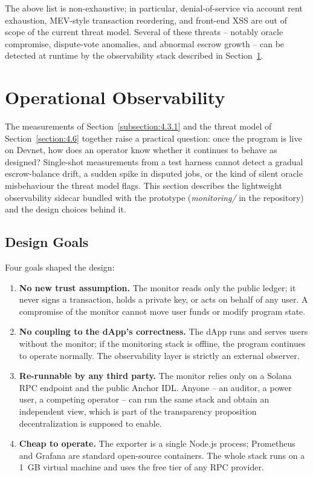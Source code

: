 \noindent The above list is non-exhaustive; in particular, denial-of-service via account rent exhaustion, MEV-style transaction reordering, and front-end XSS are out of scope of the current threat model. Several of these threats -- notably oracle compromise, dispute-vote anomalies, and abnormal escrow growth -- can be detected at runtime by the observability stack described in Section~\ref{section:4.7}.

\section{Operational Observability}
\label{section:4.7}

The measurements of Section~\ref{subsection:4.3.1} and the threat model of Section~\ref{section:4.6} together raise a practical question: once the program is live on Devnet, how does an operator know whether it continues to behave as designed? Single-shot measurements from a test harness cannot detect a gradual escrow-balance drift, a sudden spike in disputed jobs, or the kind of silent oracle misbehaviour the threat model flags. This section describes the lightweight observability sidecar bundled with the prototype (\emph{monitoring/} in the repository) and the design choices behind it.

\subsection{Design Goals}
\label{subsection:4.7.1}

Four goals shaped the design:
\begin{enumerate}[noitemsep]
    \item \textbf{No new trust assumption.} The monitor reads only the public ledger; it never signs a transaction, holds a private key, or acts on behalf of any user. A compromise of the monitor cannot move user funds or modify program state.
    \item \textbf{No coupling to the dApp's correctness.} The dApp runs and serves users without the monitor; if the monitoring stack is offline, the program continues to operate normally. The observability layer is strictly an external observer.
    \item \textbf{Re-runnable by any third party.} The monitor relies only on a Solana RPC endpoint and the public Anchor IDL. Anyone -- an auditor, a power user, a competing operator -- can run the same stack and obtain an independent view, which is part of the transparency proposition decentralization is supposed to enable.
    \item \textbf{Cheap to operate.} The exporter is a single Node.js process; Prometheus and Grafana are standard open-source containers. The whole stack runs on a 1~GB virtual machine and uses the free tier of any RPC provider.
\end{enumerate}

